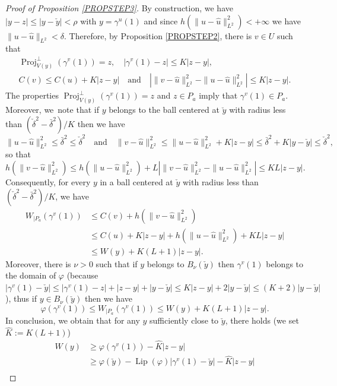 \documentclass[JEP,XML,SOM,Unicode,NoFloatCountersInSection,published]{cedram}
\DeclareMathOperator{\Lip}{Lip}
\DeclareMathOperator{\Proj}{Proj}
\theoremstyle{definition}
\begin{document}
\begin{proof}[Proof of Proposition \ref{PROPSTEP3}]
By construction, we have $|y-z| \leq |y-\check{y}| < \rho $ with $y=\gamma^u(1)$ and since \hbox{$h(\|u-\hat{u}\|_{L^2}^2)<+\infty$} we have $\|u-\hat{u}\|_{L^2}<\delta$. Therefore, by Proposition \ref{PROPSTEP2}, there is $v\in U$ such that
\begin{gather*}
\Proj_{V(y)}^{\perp} \left(\gamma^{v}(1)\right)=z, \quad
\left|\gamma^v(1)-z \right| \leq K |z-y|,
\\
C(v) \leq C(u) + K |z - y| \quad \text{and} \quad \left| \| v-\hat{u}\|_{L^2}^2 - \| u-\hat{u}\|_{L^2}^2 \right| \leq K | z-y|.
\end{gather*}
The properties $\Proj_{V(y)}^{\perp}(\gamma^{v}(1))=z$ and $z\in P_a$ imply that $\gamma^{v}(1)\in P_a$. Moreover, we~note that if $y$ belongs to the ball centered at $\check{y}$ with radius less than $(\check{\delta}^2-\bar{\delta}^2)/K$ then we have
\[
\| u-\hat{u}\|_{L^2}^2 \leq \bar{\delta}^2 \leq \check{\delta}^2 \quad
\text{and} \quad \|v-\hat{u}\|_{L^2}^2 \leq \| u-\hat{u}\|_{L^2}^2+K |z-y| \leq \bar{\delta}^2+K |y-\check{y}| \leq \check{\delta}^2,
\]
so that
\[
h\left(\|v-\hat{u}\|_{L^2}^2\right)\leq h\left(\|u-\hat{u}\|_{L^2}^2\right) + L \left| \| v-\hat{u}\|_{L^2}^2 - \| u-\hat{u}\|_{L^2}^2 \right| \leq KL |z-y|.
\]
Consequently, for every $y$ in a ball centered at $\check{y}$ with radius less than $(\check{\delta}^2-\bar{\delta}^2)/K$, we have
\begin{align*}
W_{|P_a} \left(\gamma^v(1)\right) & \leq  C(v) + h\left(\|v-\hat{u}\|_{L^2}^2\right) \\
& \leq  C(u) + K |z -y| + h\left(\|u-\hat{u}\|_{L^2}^2\right) + KL |z-y|\\
& \leq  W (y) + K(L+1) |z - y|.
\end{align*}
Moreover, there is $\nu >0$ such that if $y$ belongs to $B_{\nu}(\check{y})$ then $\gamma^v(1)$ belongs to the domain of $\varphi$ (because $|\gamma^v(1)-\check{y}| \leq |\gamma^v(1)-z| +|z-y| + |y-\check{y}| \leq K | z-y| +2|y-\check{y}| \leq (K+2) |y-\check{y}|$), thus if $y\in B_{\nu}(\check{y})$ then we have
\begin{equation*}
\varphi \left(\gamma^v(1)\right)\leq W_{|P_a} \left(\gamma^v(1)\right) \leq W (y) + K(L+1) \left|z - y\right|.
\end{equation*}
In conclusion, we obtain that for any $y$ sufficiently close to $\check{y}$, there holds (we set $\hat{K}:=K(L+1)$)
\begin{align*}
W(y) & \geq  \varphi \left(\gamma^v(1)\right) - \hat{K} \left| z-y\right|\\
& \geq  \varphi \left(\check{y}\right) - \Lip(\varphi) \left| \gamma^v(1)-\check{y}\right| - \hat{K} \left| z-y\right|\\

\end{align*}
\end{proof}
\end{document}
